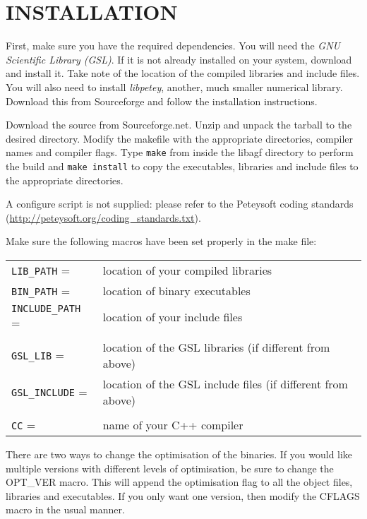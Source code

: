 \documentclass[12pt]{article}
\begin{document}
\section{INSTALLATION}

  First, make sure you have the required dependencies.  You will need the {\it GNU Scientific Library (GSL)}.  If it is not already installed on your system, download and install it.  Take note of the location of the compiled libraries and include files.  You will also need to install {\it libpetey}, another, much smaller numerical library.  Download this from Sourceforge and follow the installation instructions.

  Download the source from Sourceforge.net.  Unzip and unpack the tarball to the desired directory.  Modify the makefile with the appropriate directories, compiler names and compiler flags.  Type \verb"make" from inside the libagf directory to perform the build and \verb"make install" to copy the executables, libraries and include files to the appropriate directories.

  A configure script is not supplied: please refer to the Peteysoft coding standards (\url{http://peteysoft.org/coding\_standards.txt}).

  Make sure the following macros have been set properly in the make file:

\begin{tabular}{ll}
	\verb/LIB_PATH/ = & location of your compiled libraries\\
	\verb/BIN_PATH/ = & location of binary executables\\
	\verb/INCLUDE_PATH/ = & location of your include files\\
	& \\
\verb/GSL_LIB/ = & location of the GSL libraries (if different from above)\\
\verb/GSL_INCLUDE/ = & location of the GSL include files (if different from above)\\
		     & \\
	\verb/CC/ = & name of your C++ compiler
\end{tabular}

  There are two ways to change the optimisation of the binaries.  If you would like multiple versions with different levels of optimisation, be sure to change the OPT\_VER macro.  This will append the optimisation flag to all the object files, libraries and executables.  If you only want one version, then modify the CFLAGS macro in the usual manner.
\end{document}
